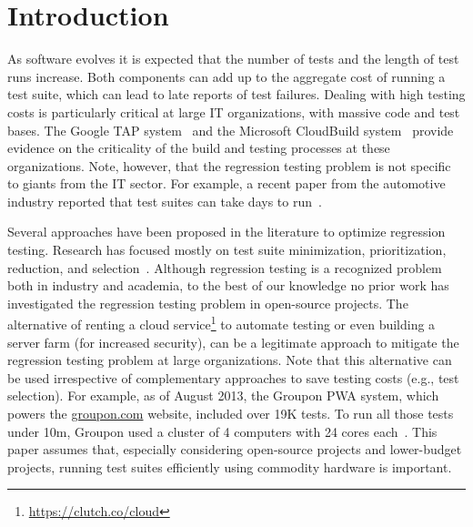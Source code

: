 \section{Introduction}


As software evolves it is expected that the number of tests and the
length of test runs increase.  Both components can add up to the
aggregate cost of running a test suite, which can lead to late reports
of test failures.  Dealing with high testing costs is particularly
critical at large IT organizations, with massive code and test bases.
The Google TAP system~\cite{google-tap,google-ci} and the Microsoft
CloudBuild system~\cite{prasad-shulte-ieee-microsoft-ci} provide
evidence on the criticality of the build and testing processes at
these organizations.  Note, however, that the regression testing
problem is not specific to giants from the IT sector.  For example, a
recent paper from the automotive industry reported that test suites
can take days to run~\cite{artl-etal-icst2015}.


Several approaches have been proposed in the literature to optimize
regression testing.  Research has focused mostly on test suite
minimization, prioritization, reduction, and
selection~\cite{yoo-harman-stvr2012}.  Although regression testing is
a recognized problem both in industry and academia, to the best of our
knowledge no prior work has investigated the regression testing
problem in open-source projects.  The alternative of renting a cloud
service\footnote{\url{https://clutch.co/cloud}} to automate testing or
even building a server farm (for increased security), can be a
legitimate approach to mitigate the regression testing problem at
large organizations.  Note that this alternative can be used
irrespective of complementary approaches to save testing costs (e.g.,
test selection).  For example, as of August 2013, the Groupon PWA
system, which powers the \url{groupon.com} website, included over 19K
tests.  To run all those tests under 10m, Groupon used a cluster of 4
computers with 24 cores each~\cite{kim-etal-fse2013}.  This paper
assumes that, especially considering open-source projects and
lower-budget projects, running test suites efficiently using commodity
hardware is important.

